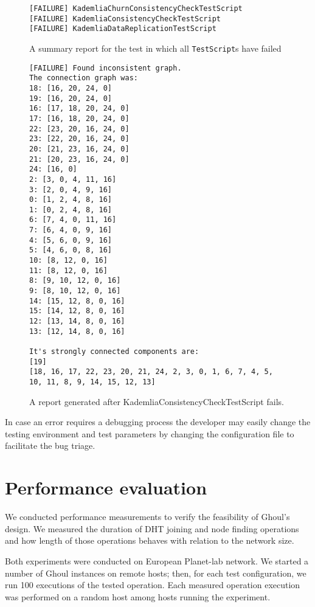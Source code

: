 \begin{figure}[tbp]
\begin{verbatim}
[FAILURE] KademliaChurnConsistencyCheckTestScript
[FAILURE] KademliaConsistencyCheckTestScript
[FAILURE] KademliaDataReplicationTestScript
\end{verbatim}
\caption{A summary report for the test in which all \texttt{TestScript}s have
failed}
\label{fig:sumrep_failure}
\end{figure}

\begin{figure}[tbp]
\begin{verbatim}
[FAILURE] Found inconsistent graph.
The connection graph was:
18: [16, 20, 24, 0]
19: [16, 20, 24, 0]
16: [17, 18, 20, 24, 0]
17: [16, 18, 20, 24, 0]
22: [23, 20, 16, 24, 0]
23: [22, 20, 16, 24, 0]
20: [21, 23, 16, 24, 0]
21: [20, 23, 16, 24, 0]
24: [16, 0]
2: [3, 0, 4, 11, 16]
3: [2, 0, 4, 9, 16]
0: [1, 2, 4, 8, 16]
1: [0, 2, 4, 8, 16]
6: [7, 4, 0, 11, 16]
7: [6, 4, 0, 9, 16]
4: [5, 6, 0, 9, 16]
5: [4, 6, 0, 8, 16]
10: [8, 12, 0, 16]
11: [8, 12, 0, 16]
8: [9, 10, 12, 0, 16]
9: [8, 10, 12, 0, 16]
14: [15, 12, 8, 0, 16]
15: [14, 12, 8, 0, 16]
12: [13, 14, 8, 0, 16]
13: [12, 14, 8, 0, 16]

It's strongly connected components are:
[19]
[18, 16, 17, 22, 23, 20, 21, 24, 2, 3, 0, 1, 6, 7, 4, 5, 10, 11, 8, 9, 14, 15, 12, 13]
\end{verbatim}
\caption{A report generated after KademliaConsistencyCheckTestScript fails.}
\label{fig:conrep}
\end{figure}

In case an error requires a debugging process the developer may easily change
the testing environment and test parameters by changing the configuration file
to facilitate the bug triage.

\section{Performance evaluation}
\label{sec:performance}

We conducted performance measurements to verify the feasibility of Ghoul's
design.
We measured the duration of DHT joining and node finding operations and how
length of those operations behaves with relation to the network size.

Both experiments were conducted on European Planet-lab network.
We started a number of Ghoul instances on remote hosts; then, for each test
configuration, we run 100 executions of the tested operation.
Each measured operation execution was performed on a random host among hosts
running the experiment.

